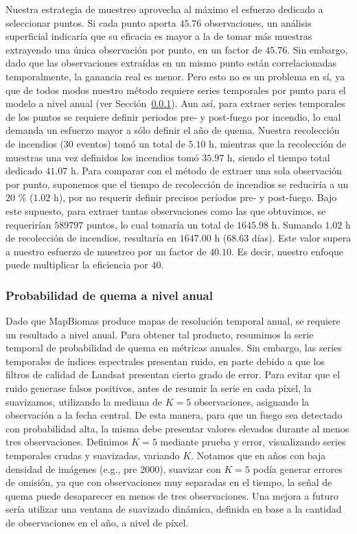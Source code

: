 \documentclass[11pt,a4paper]{article}
\begin{document}
Nuestra estrategia de muestreo aprovecha al máximo el esfuerzo dedicado a seleccionar puntos. Si cada punto aporta $45.76$ observaciones, un análisis superficial indicaría que su eficacia es mayor a la de tomar más muestras extrayendo una única observación por punto, en un factor de $45.76$. Sin embargo, dado que las observaciones extraídas en un mismo punto están correlacionadas temporalmente, la ganancia real es menor. Pero esto no es un problema en sí, ya que de todos modos nuestro método requiere series temporales por punto para el modelo a nivel anual (ver Sección~\ref{sec-prob-anual}). Aun así, para extraer series temporales de los puntos se requiere definir periodos pre- y post-fuego por incendio, lo cual demanda un esfuerzo mayor a sólo definir el año de quema. Nuestra recolección de incendios (30 eventos) tomó un total de $5.10$ h, mientras que la recolección de muestras una vez definidos los incendios tomó $35.97$ h, siendo el tiempo total dedicado $41.07$ h. Para comparar con el método de extraer una sola observación por punto, suponemos que el tiempo de recolección de incendios se reduciría a un $20$ \% ($1.02$ h), por no requerir definir precisos períodos pre- y post-fuego. Bajo este supuesto, para extraer tantas observaciones como las que obtuvimos, se requerirían $589797$ puntos, lo cual tomaría un total de $1645.98$ h. Sumando $1.02$ h de recolección de incendios, resultaría en $1647.00$ h ($68.63$ días). Este valor supera a nuestro esfuerzo de muestreo por un factor de $40.10$. Es decir, nuestro enfoque puede multiplicar la eficiencia por $40$.

\subsubsection{Probabilidad de quema a nivel anual}\label{sec-prob-anual}

Dado que MapBiomas produce mapas de resolución temporal anual, se requiere un resultado a nivel anual. Para obtener tal producto, resumimos la serie temporal de probabilidad de quema en métricas anuales. Sin embargo, las series temporales de índices espectrales presentan ruido, en parte debido a que los filtros de calidad de Landsat presentan cierto grado de error. Para evitar que el ruido generase falsos positivos, antes de resumir la serie en cada píxel, la suavizamos, utilizando la mediana de $K = 5$ observaciones, asignando la observación a la fecha central. De esta manera, para que un fuego sea detectado con probabilidad alta, la misma debe presentar valores elevados durante al menos tres observaciones. Definimos $K = 5$ mediante prueba y error, visualizando series temporales crudas y suavizadas, variando $K$. Notamos que en años con baja densidad de imágenes (e.g., pre 2000), suavizar con $K = 5$ podía generar errores de omisión, ya que con observaciones muy separadas en el tiempo, la señal de quema puede desaparecer en menos de tres observaciones. Una mejora a futuro sería utilizar una ventana de suavizado dinámica, definida en base a la cantidad de observaciones en el año, a nivel de píxel.
\end{document}
